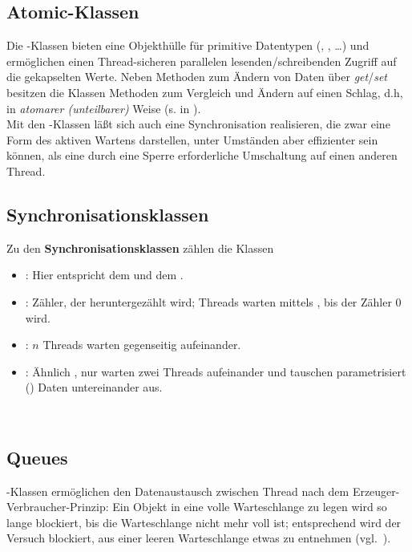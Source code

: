 \subsection*{Atomic-Klassen}
Die -Klassen bieten eine Objekthülle für primitive Datentypen (, , \ldots) und ermöglichen einen Thread-sicheren parallelen lesenden/schreibenden Zugriff auf die gekapselten Werte.
Neben Methoden zum Ändern von Daten über \textit{get}/\textit{set} besitzen die Klassen Methoden zum Vergleich und Ändern auf einen Schlag, d.h, in \textit{atomarer (unteilbarer)} Weise (s.  in \cite[157]{Oec22}).\\

\noindent
Mit den -Klassen läßt sich auch eine  Synchronisation realisieren, die zwar eine Form des aktiven Wartens darstellen, unter Umständen aber effizienter sein können, als eine durch eine Sperre erforderliche Umschaltung auf einen anderen Thread.\\

\subsection*{Synchronisationsklassen}
Zu den \textbf{Synchronisationsklassen} zählen die Klassen
\begin{itemize}
    \item {}: Hier entspricht  dem  und  dem .
    \item {}: Zähler, der heruntergezählt wird; Threads warten mittels , bis der Zähler $0$ wird.
    \item {}: $n$ Threads warten gegenseitig aufeinander.
    \item {}: Ähnlich , nur warten zwei Threads aufeinander und tauschen parametrisiert () Daten untereinander aus.
\end{itemize}\\

\subsection*{Queues}
-Klassen ermöglichen den  Datenaustausch zwischen Thread nach dem Erzeuger-Verbraucher-Prinzip: Ein Objekt in eine volle Warteschlange zu legen wird so lange blockiert, bis die Warteschlange nicht mehr voll ist; entsprechend wird der Versuch blockiert, aus einer leeren Warteschlange etwas zu entnehmen (vgl.~\cite[164]{Oec22}).

